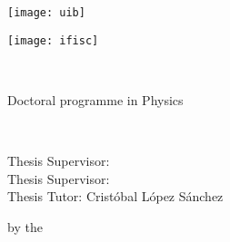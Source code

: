 \documentclass[../thesis.tex]{subfiles}
\begin{document}
\begin{titlepage}
    \begin{addmargin}[-1cm]{-3cm}
        \large

        \hfill
        \begin{minipage}[c][0.2\textheight]{0.5\textwidth}
            \texttt{[image: uib]}
        \end{minipage}
        \hfill
        \begin{minipage}[c][0.2\textheight]{0.5\textwidth}
            \texttt{[image: ifisc]}
        \end{minipage}
        \hfill

        \begin{center}
            \vspace*{.1\textheight}
        
             \\
            \myYear
        
            \bigskip

            Doctoral programme in Physics \\

            \vfill
        
            \begingroup
                \spacedallcaps{\myTitle}
                \\ \smallskip
                \textsc{\MakeLowercase{\mySubtitle}}
            \endgroup

            \bigskip
            
            \spacedlowsmallcaps{\myName}
            
            \vfill

            \begin{flushleft}
                Thesis Supervisor: \mySupervisor \\
                Thesis Supervisor: \myOtherSupervisor \\
                Thesis Tutor: Cristóbal López Sánchez\\

                \vfill

                \myDegree by the \myUni
            \end{flushleft}
        
        \end{center}
    \end{addmargin}
\end{titlepage}
\end{document}

